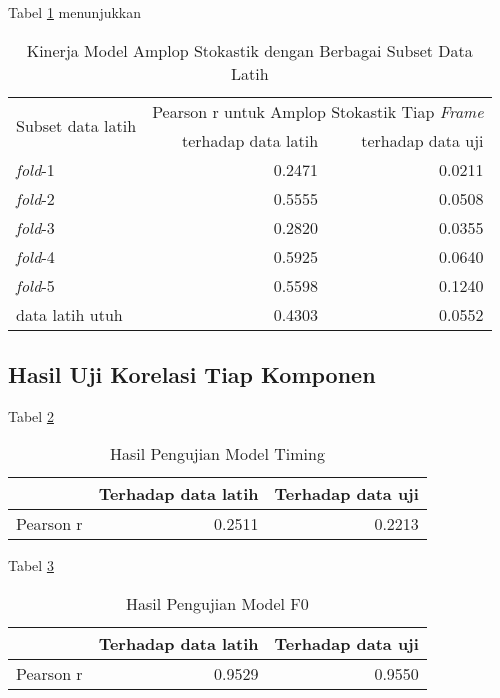 Tabel \ref{tab-stoc-model-subset-results} menunjukkan \blindtext
\begin{table}[h]
    \centering
    \caption{Kinerja Model Amplop Stokastik dengan Berbagai Subset Data Latih}\label{tab-stoc-model-subset-results}
    \begin{tabular}{ |l|r|r| } 
     \hline
     \multirow{2}{*}{Subset data latih} & \multicolumn{2}{l|}{Pearson r untuk Amplop Stokastik Tiap \textit{Frame}} \\
     \cline{2-3}
     & terhadap data latih & terhadap data uji \\\hline
	\textit{fold}-1       &0.2471  &0.0211\\\hline
	\textit{fold}-2       &0.5555  &0.0508\\\hline
	\textit{fold}-3       &0.2820  &0.0355\\\hline
	\textit{fold}-4       &0.5925  &0.0640\\\hline
	\textit{fold}-5       &0.5598  &0.1240\\\hline
	data latih utuh       &0.4303  &0.0552\\\hline
    \end{tabular}
\end{table}

\subsection{Hasil Uji Korelasi Tiap Komponen}

Tabel \ref{tab-timing-testing-results} \blindtext
\begin{table}[h]
    \centering
    \caption{Hasil Pengujian Model Timing}\label{tab-timing-testing-results}
    \begin{tabular}{ |l|r|r| } 
     \cline{2-3}
     \multicolumn{1}{l|}{}&Terhadap data latih&Terhadap data uji\\\hline
	 Pearson r&0.2511  &0.2213\\\hline
    \end{tabular}
\end{table}

Tabel \ref{tab-f0-testing-results} \blindtext
\begin{table}[h]
    \centering
    \caption{Hasil Pengujian Model F0}\label{tab-f0-testing-results}
    \begin{tabular}{ |l|r|r| } 
     \cline{2-3}
     \multicolumn{1}{l|}{}&Terhadap data latih&Terhadap data uji\\\hline
	 Pearson r&0.9529  &0.9550\\\hline
    \end{tabular}
\end{table}

